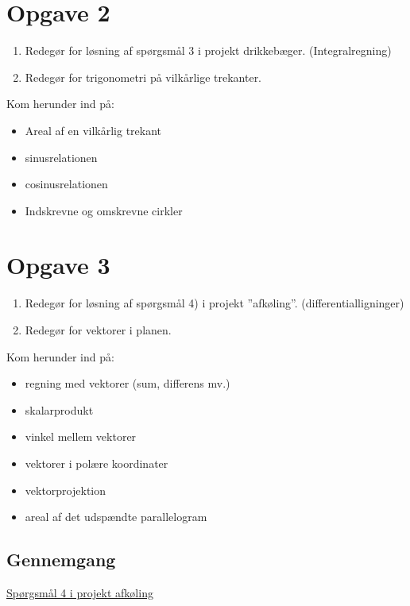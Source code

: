 \documentclass[a4paper, 11pt]{article}
\begin{document}
\section*{Opgave 2}
\begin{enumerate}[label=\alph*)]
    \item Redegør for løsning af spørgsmål 3 i projekt drikkebæger. (Integralregning)
    \item Redegør for trigonometri på vilkårlige trekanter.
\end{enumerate}
\indent \indent Kom herunder ind på:
\begin{itemize}
    \item Areal af en vilkårlig trekant
    \item sinusrelationen
    \item cosinusrelationen
    \item Indskrevne og omskrevne cirkler
\end{itemize} 
\clearpage
\section*{Opgave 3}
\begin{enumerate}[label=\alph*)]
    \item Redegør for løsning af spørgsmål 4) i projekt ”afkøling”. (differentialligninger)
    \item Redegør for vektorer i planen.
\end{enumerate}
\indent \indent Kom herunder ind på:
\begin{itemize}
    \item regning med vektorer (sum, differens mv.)
    \item skalarprodukt
    \item vinkel mellem vektorer
    \item vektorer i polære koordinater
    \item vektorprojektion
    \item areal af det udspændte parallelogram
\end{itemize} 
\subsection*{Gennemgang}
\underline{Spørgsmål 4 i projekt afkøling}
\clearpage
\end{document}
